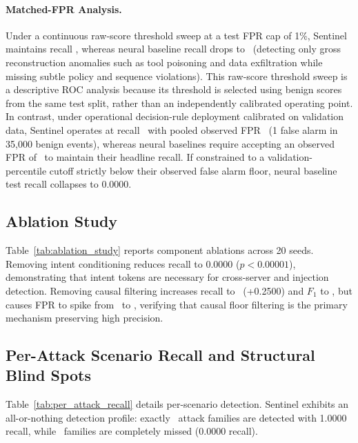 \documentclass{llncs}
\begin{document}
\paragraph{Matched-FPR Analysis.} Under a continuous raw-score threshold sweep at a test FPR cap of 1\%, Sentinel maintains recall \MatchedFPRSentinelRawRecall, whereas neural baseline recall drops to \MatchedFPRNeuralRawRecall\ (detecting only gross reconstruction anomalies such as tool poisoning and data exfiltration while missing subtle policy and sequence violations). This raw-score threshold sweep is a descriptive ROC analysis because its threshold is selected using benign scores from the same test split, rather than an independently calibrated operating point. In contrast, under operational decision-rule deployment calibrated on validation data, Sentinel operates at recall \MatchedFPRDecisionRuleRecall\ with pooled observed FPR \SentinelObservedFPR\ (1 false alarm in 35,000 benign events), whereas neural baselines require accepting an observed FPR of \DenseAECalibrationFloor\ to maintain their headline recall. If constrained to a validation-percentile cutoff strictly below their observed false alarm floor, neural baseline test recall collapses to 0.0000.

\subsection{Ablation Study}
Table~\ref{tab:ablation_study} reports component ablations across 20 seeds. Removing intent conditioning reduces recall to $0.0000$ ($p < 0.00001$), demonstrating that intent tokens are necessary for cross-server and injection detection. Removing causal filtering increases recall to \AblationCausalRecall\ (+0.2500) and $F_1$ to \AblationCausalFOne, but causes FPR to spike from \SentinelFPR\ to \AblationCausalFPR, verifying that causal floor filtering is the primary mechanism preserving high precision.



\subsection{Per-Attack Scenario Recall and Structural Blind Spots}
Table~\ref{tab:per_attack_recall} details per-scenario detection. Sentinel exhibits an all-or-nothing detection profile: exactly \DetectedAttackFamilies\ attack families are detected with 1.0000 recall, while \ZeroRecallFamilies\ families are completely missed ($0.0000$ recall).
\end{document}
